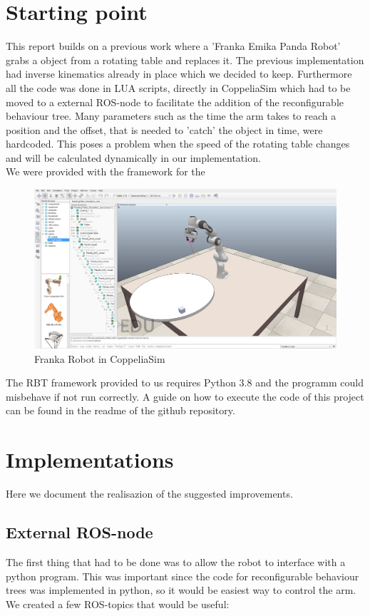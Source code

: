 \documentclass[report]{iisthesis}
\begin{document}
\chapter{Starting point}
This report builds on a previous work where a 'Franka Emika Panda Robot' grabs a object from a rotating table and replaces it.
The previous implementation had inverse kinematics already in place which we decided to keep. Furthermore all the code was done in LUA scripts, directly in CoppeliaSim which had to be moved to a external ROS-node to facilitate the addition of the reconfigurable behaviour tree.
Many parameters such as the time the arm takes to reach a position and the offset, that is needed to 'catch' the object in time, were hardcoded. This poses a problem when the speed of the rotating table changes and will be calculated dynamically in our implementation.\\
We were provided with the framework for the 

\begin{figure}[h]
    \caption{Franka Robot in CoppeliaSim}
    \includegraphics[width=\textwidth]{arm_coppeliaSim}
\end{figure}
\noindent
The RBT framework provided to us requires Python 3.8 and the programm could misbehave if not run correctly.
A guide on how to execute the code of this project can be found in the readme of the github repository. 

\chapter{Implementations}
Here we document the realisazion of the suggested improvements.

\section{External ROS-node}
The first thing that had to be done was to allow the robot to interface with a python program.
This was important since the code for reconfigurable behaviour trees was implemented in python, so it would be easiest way to control the 
arm.
We created a few ROS-topics that would be useful:
\end{document}
